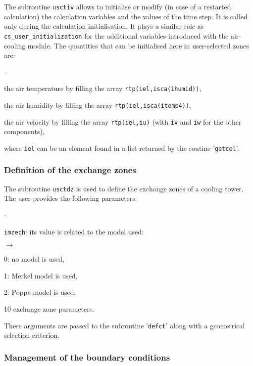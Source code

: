 {{{The subroutine \texttt{usctiv} allows to initialise or modify 
(in case of a restarted calculation) the calculation variables and the
 values of the time step. It is called only during the calculation 
initialisation. It plays a similar role as \texttt{cs\_user\_initialization} for the 
additional variables introduced with the air-cooling module. The 
quantities that can be initialised here in user-selected zones are:
\begin{list}{-}{}
 \item the air temperature by filling the array \texttt{rtp(iel,isca(ihumid))},
 \item the air humidity by filling the array \texttt{rtp(iel,isca(itemp4))},
 \item the air velocity by filling the array \texttt{rtp(iel,iu)} (with
 \texttt{iv} and \texttt{iw} for the other components),
\end{list}
where \texttt{iel} can be an element found in a list returned by the routine
 '\texttt{getcel}'.

\subsubsection{Definition of the exchange zones}

The subroutine \texttt{usctdz} is used to define the exchange zones of a cooling
 tower. The user provides the following parameters:
\begin{list}{-}{}
 \item \texttt{imzech}: its value is related to the model used:
      \begin{list}{$\rightarrow$}{}
       \item 0: no model is used,
       \item 1: Merkel model is used,
       \item 2: Poppe model is used,
      \end{list}
 \item 10 exchange zone parameters.
\end{list}
These arguments are passed to the subroutine '\texttt{defct}' along with a 
geometrical selection criterion.

\subsubsection{Management of the boundary conditions}

}}}
